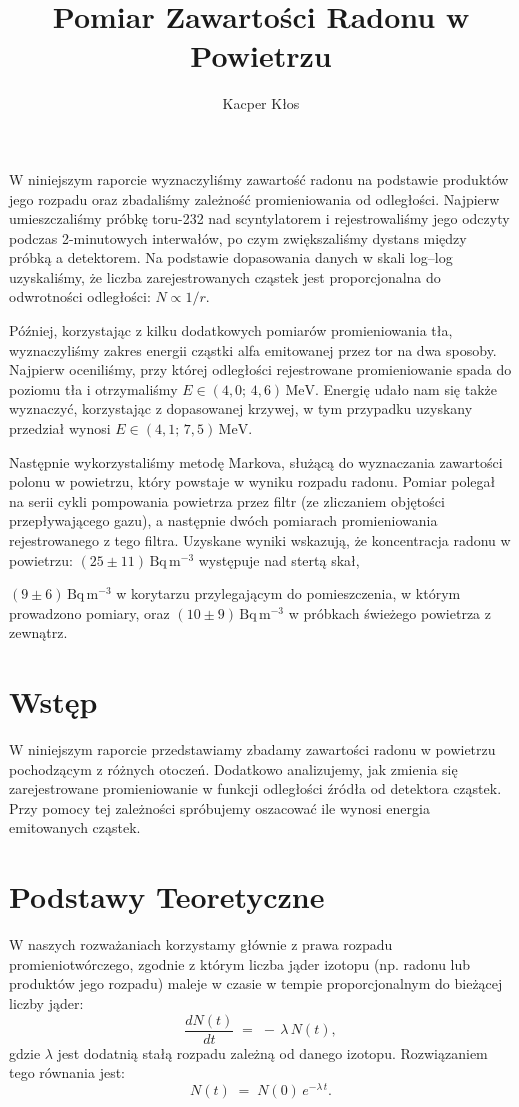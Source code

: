 \documentclass[12pt]{article}
\title{Pomiar Zawartości Radonu w Powietrzu}
\author{Kacper Kłos}
\begin{document}
\maketitle

W niniejszym raporcie wyznaczyliśmy zawartość radonu na podstawie produktów jego rozpadu oraz zbadaliśmy zależność promieniowania od odległości. Najpierw umieszczaliśmy próbkę toru-232 nad scyntylatorem i rejestrowaliśmy jego odczyty podczas 2-minutowych interwałów, po czym zwiększaliśmy dystans między próbką a detektorem. Na podstawie dopasowania danych w skali log–log uzyskaliśmy, że liczba zarejestrowanych cząstek jest proporcjonalna do odwrotności odległości: \(N \propto 1/r\).

Później, korzystając z kilku dodatkowych pomiarów promieniowania tła, wyznaczyliśmy zakres energii cząstki alfa emitowanej przez tor na dwa sposoby. Najpierw oceniliśmy, przy której odległości rejestrowane promieniowanie spada do poziomu tła i otrzymaliśmy $E \in (4{,}0;\,4{,}6)\,\mathrm{MeV}$. Energię udało nam się także wyznaczyć, korzystając z dopasowanej krzywej, w tym przypadku uzyskany przedział wynosi $E \in (4{,}1;\,7{,}5)\,\mathrm{MeV}$.

Następnie wykorzystaliśmy metodę Markova, służącą do wyznaczania zawartości polonu w powietrzu, który powstaje w wyniku rozpadu radonu. Pomiar polegał na serii cykli pompowania powietrza przez filtr (ze zliczaniem objętości przepływającego gazu), a następnie dwóch pomiarach promieniowania rejestrowanego z tego filtra. Uzyskane wyniki wskazują, że koncentracja radonu w powietrzu: \((25 \pm 11)\,\mathrm{Bq\,m^{-3}}\) występuje nad stertą skał,

\((9 \pm 6)\,\mathrm{Bq\,m^{-3}}\) w korytarzu przylegającym do pomieszczenia, w którym prowadzono pomiary, oraz \((10 \pm 9)\,\mathrm{Bq\,m^{-3}}\) w próbkach świeżego powietrza z zewnątrz.


\newpage

\section{Wstęp}
W niniejszym raporcie przedstawiamy zbadamy zawartości radonu w powietrzu pochodzącym z różnych otoczeń. Dodatkowo analizujemy, jak zmienia się zarejestrowane promieniowanie w funkcji odległości źródła od detektora cząstek. Przy pomocy tej zależności spróbujemy oszacować ile wynosi energia emitowanych cząstek.

\section{Podstawy Teoretyczne}
W naszych rozważaniach korzystamy głównie z prawa rozpadu promieniotwórczego, zgodnie z którym liczba jąder izotopu (np. radonu lub produktów jego rozpadu) maleje w czasie w tempie proporcjonalnym do bieżącej liczby jąder:
\[
	\frac{dN(t)}{dt} \;=\; -\,\lambda\,N(t),
\]
gdzie \(\lambda\) jest dodatnią stałą rozpadu zależną od danego izotopu. Rozwiązaniem tego równania jest:
\begin{equation}
	N(t) \;=\; N(0)\,e^{-\lambda\,t}.
	\label{eq:decay}
\end{equation}
\end{document}
